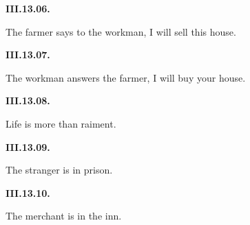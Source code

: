 \par\begin{minipage}{\linewidth}\raggedright
\textbf{III.13.06.}

The farmer says to the workman, I will sell this house.

\end{minipage}\par\addvspace{4pt}

\par\begin{minipage}{\linewidth}\raggedright
\textbf{III.13.07.}

The workman answers the farmer, I will buy your house.

\end{minipage}\par\addvspace{4pt}

\par\begin{minipage}{\linewidth}\raggedright
\textbf{III.13.08.}

Life is more than raiment.

\end{minipage}\par\addvspace{4pt}

\par\begin{minipage}{\linewidth}\raggedright
\textbf{III.13.09.}

The stranger is in prison.

\end{minipage}\par\addvspace{4pt}

\par\begin{minipage}{\linewidth}\raggedright
\textbf{III.13.10.}

The merchant is in the inn.

\end{minipage}\par\addvspace{4pt}

